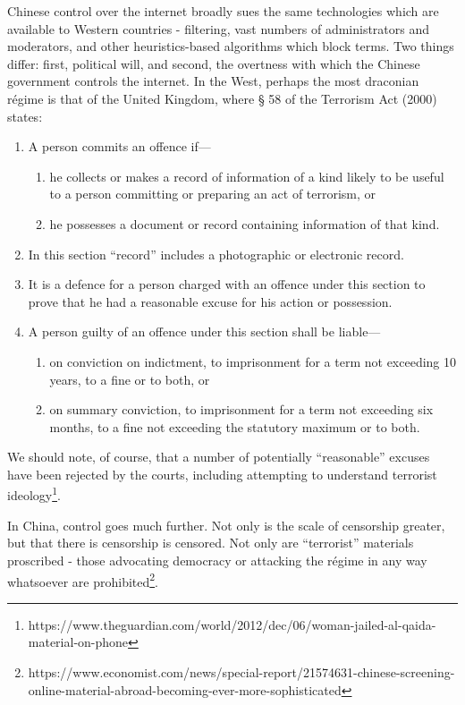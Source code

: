 \documentclass[11pt,a4paper]{report}
\newcounter{count}
\begin{document}
\begin{multicols}{2}
Chinese control over the internet broadly sues the same technologies
which are available to Western countries - filtering, vast numbers of
administrators and moderators, and other heuristics-based algorithms
which block terms. Two things differ: first, political will, and second,
the overtness with which the Chinese government controls the internet.
In the West, perhaps the most draconian régime is that of the United
Kingdom, where § 58 of the Terrorism Act (2000) states:

\begin{enumerate}
	\item
	A person commits an offence if---
	
	\begin{enumerate}
		\item
		he collects or makes a record of information of a kind likely to be
		useful to a person committing or preparing an act of terrorism, or
		\item
		he possesses a document or record containing information of that
		kind.
	\end{enumerate}
	\item
	In this section ``record'' includes a photographic or electronic
	record.
	\item
	It is a defence for a person charged with an offence under this
	section to prove that he had a reasonable excuse for his action or
	possession.
	\item
	A person guilty of an offence under this section shall be liable---
	
	\begin{enumerate}
		\item
		on conviction on indictment, to imprisonment for a term not
		exceeding 10 years, to a fine or to both, or
		\item
		on summary conviction, to imprisonment for a term not exceeding six
		months, to a fine not exceeding the statutory maximum or to both.
	\end{enumerate}
\end{enumerate}

We should note, of course, that a number of potentially ``reasonable''
excuses have been rejected by the courts, including attempting to
understand terrorist ideology\footnote{https://www.theguardian.com/world/2012/dec/06/woman-jailed-al-qaida-material-on-phone}.

In China, control goes much further. Not only is the scale of censorship
greater, but that there is censorship is censored. Not only are
``terrorist'' materials proscribed - those advocating democracy or
attacking the régime in any way whatsoever are prohibited\footnote{https://www.economist.com/news/special-report/21574631-chinese-screening-online-material-abroad-becoming-ever-more-sophisticated}.


\end{multicols}
\end{document}

